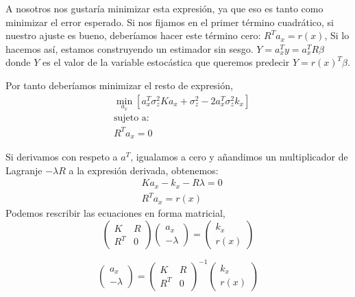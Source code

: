 \documentclass[10pt,a4paper]{report}
\begin{document}
A nosotros nos gustaría minimizar esta expresión, ya que eso es tanto como minimizar el error esperado. Si nos fijamos en el primer término cuadrático, si nuestro ajuste es bueno, deberíamos hacer este término cero: $R^Ta_x = r(x)$, Si lo hacemos así, estamos construyendo un estimador sin sesgo. $Y = a_x^Ty = a_x^TR\beta$ donde $Y$ es el valor de la variable estocástica que queremos predecir $Y = r(x)^T\beta$.

Por tanto deberíamos minimizar el resto de expresión,
\begin{equation}
\begin{split}
&\min_{a_x}\left[{a_x^T\sigma_z^2 Ka_x+\sigma_z^2-2a_x^T\sigma_z^2 k_x}\right]\\
&\text{sujeto a:}\\
& R^Ta_x = 0
\end{split}
\end{equation}

Si derivamos con respeto a $a^T$, igualamos a cero y añandimos un multiplicador de Lagranje $-\lambda R$ a la expresión derivada, obtenemos:
\begin{equation}
\begin{split}
&Ka_x - k_x-R\lambda = 0\\
&R^Ta_x = r(x)
\end{split}
\end{equation} 
Podemos rescribir las ecuaciones en forma matricial,
\begin{equation}
\begin{pmatrix}
K & R\\
R^T & 0
\end{pmatrix} \begin{pmatrix}
a_x \\ -\lambda
\end{pmatrix}= \begin{pmatrix}k_x \\ r(x)
\end{pmatrix}
\end{equation}

\begin{equation}
 \begin{pmatrix}
a_x \\ -\lambda
\end{pmatrix}= \begin{pmatrix}
K & R\\
R^T & 0
\end{pmatrix}^{-1}\begin{pmatrix} k_x \\ r(x)
\end{pmatrix}
\end{equation}
\end{document}
